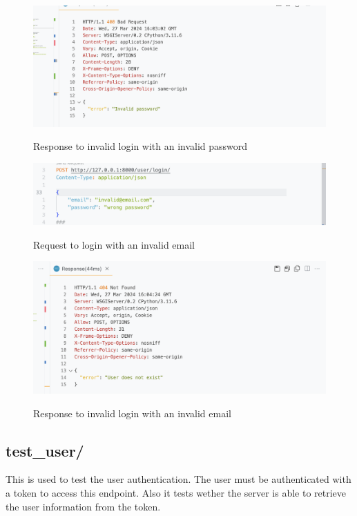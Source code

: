\begin{figure}[H]
    \caption{Response to invalid login with an invalid password}
    \includegraphics[width=\textwidth]{Assets/api_test/response_login_invalid_password.png}
    \label{fig:response_login_invalid_password}
\end{figure}



\begin{figure}[H]
    \caption{Request to login with an invalid email}
    \includegraphics[width=\textwidth]{Assets/api_test/request_login_invalid_user.png}
    \label{fig:request_login_invalid_email}
\end{figure}

\begin{figure}[H]
    \caption{Response to invalid login with an invalid email}
    \includegraphics[width=\textwidth]{Assets/api_test/response_login_invalid_user.png}
    \label{fig:response_login_invalid_email}
\end{figure}


\subsection{test\_user/}
This is used to test the user authentication. The user must be authenticated with a token to access this endpoint. Also it tests wether the server is able to retrieve the user information from the token.

